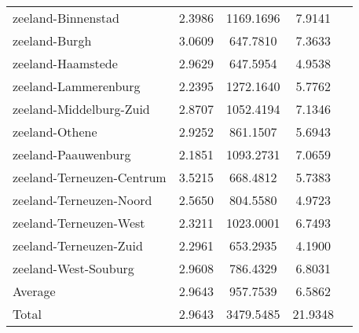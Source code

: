 \begin{longtable}{llccc}
zeeland-Binnenstad & 2.3986 & 1169.1696 & 7.9141 \\
zeeland-Burgh & 3.0609 & 647.7810 & 7.3633 \\
zeeland-Haamstede & 2.9629 & 647.5954 & 4.9538 \\
zeeland-Lammerenburg & 2.2395 & 1272.1640 & 5.7762 \\
zeeland-Middelburg-Zuid & 2.8707 & 1052.4194 & 7.1346 \\
zeeland-Othene & 2.9252 & 861.1507 & 5.6943 \\
zeeland-Paauwenburg & 2.1851 & 1093.2731 & 7.0659 \\
zeeland-Terneuzen-Centrum & 3.5215 & 668.4812 & 5.7383 \\
zeeland-Terneuzen-Noord & 2.5650 & 804.5580 & 4.9723 \\
zeeland-Terneuzen-West & 2.3211 & 1023.0001 & 6.7493 \\
zeeland-Terneuzen-Zuid & 2.2961 & 653.2935 & 4.1900 \\
zeeland-West-Souburg & 2.9608 & 786.4329 & 6.8031 \\
Average & 2.9643 & 957.7539 & 6.5862 \\
Total & 2.9643 & 3479.5485 & 21.9348 \\
\hline
\end{longtable}
